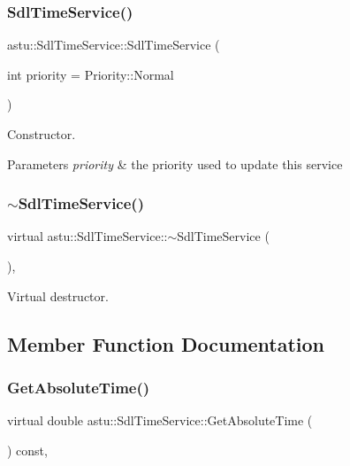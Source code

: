 \subsubsection{\texorpdfstring{Sdl\+Time\+Service()}{SdlTimeService()}}
{\footnotesize\ttfamily astu\+::\+Sdl\+Time\+Service\+::\+Sdl\+Time\+Service (\begin{DoxyParamCaption}\item[{int}]{priority = {\ttfamily Priority\+:\+:Normal} }\end{DoxyParamCaption})}

Constructor.


\begin{DoxyParams}{Parameters}
{\em priority} & the priority used to update this service \\
\hline
\end{DoxyParams}
\mbox{\label{classastu_1_1SdlTimeService_a41d6e3b0011d41a197ea625722e1a6be}} 
\subsubsection{\texorpdfstring{$\sim$\+Sdl\+Time\+Service()}{~SdlTimeService()}}
{\footnotesize\ttfamily virtual astu\+::\+Sdl\+Time\+Service\+::$\sim$\+Sdl\+Time\+Service (\begin{DoxyParamCaption}{ }\end{DoxyParamCaption})\hspace{0.3cm}{\ttfamily [inline]}, {\ttfamily [virtual]}}

Virtual destructor. 

\subsection{Member Function Documentation}
\mbox{\label{classastu_1_1SdlTimeService_ab1cd9c0977c8b93cc4cdee22e0107bde}} 
\subsubsection{\texorpdfstring{Get\+Absolute\+Time()}{GetAbsoluteTime()}}
{\footnotesize\ttfamily virtual double astu\+::\+Sdl\+Time\+Service\+::\+Get\+Absolute\+Time (\begin{DoxyParamCaption}{ }\end{DoxyParamCaption}) const\hspace{0.3cm}{\ttfamily [override]}, {\ttfamily [virtual]}}

